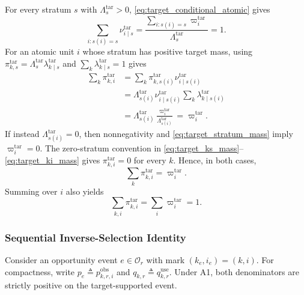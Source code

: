 For every stratum $s$ with $\Lambda_s^{\mathrm{tar}}>0$,
\eqref{eq:target_conditional_atomic} gives
\begin{equation}
    \sum_{i:s(i)=s}
    \nu^{\mathrm{tar}}_{i\mid s}
    =
    \frac{
    \sum_{i:s(i)=s}\varpi_i^{\mathrm{tar}}
    }{
    \Lambda_s^{\mathrm{tar}}
    }
    =1.
    \label{eq:app_nu_normalization}
\end{equation}
For an atomic unit $i$ whose stratum has positive target mass, using
$\pi^{\mathrm{tar}}_{k,s}
=\Lambda_s^{\mathrm{tar}}
\lambda^{\mathrm{tar}}_{k\mid s}$ and
$\sum_k\lambda^{\mathrm{tar}}_{k\mid s}=1$ gives
\begin{align}
 \sum_k\pi^{\mathrm{tar}}_{k,i}
 &=
 \sum_k
 \pi^{\mathrm{tar}}_{k,s(i)}
 \nu^{\mathrm{tar}}_{i\mid s(i)}
 \nonumber\\
 &=
 \Lambda_{s(i)}^{\mathrm{tar}}
 \nu^{\mathrm{tar}}_{i\mid s(i)}
 \sum_k
 \lambda^{\mathrm{tar}}_{k\mid s(i)}
 \nonumber\\
 &=
 \Lambda_{s(i)}^{\mathrm{tar}}
 \frac{\varpi_i^{\mathrm{tar}}}
 {\Lambda_{s(i)}^{\mathrm{tar}}}
 =
 \varpi_i^{\mathrm{tar}}.
 \label{eq:app_target_compatibility_positive}
\end{align}
If instead $\Lambda_{s(i)}^{\mathrm{tar}}=0$, then nonnegativity and
\eqref{eq:target_stratum_mass} imply $\varpi_i^{\mathrm{tar}}=0$.  The
zero-stratum convention in
\eqref{eq:target_ks_mass}--\eqref{eq:target_ki_mass}
gives $\pi^{\mathrm{tar}}_{k,i}=0$ for every $k$.  Hence, in both cases,
\begin{equation}
 \sum_k\pi^{\mathrm{tar}}_{k,i}
 =\varpi_i^{\mathrm{tar}}.
 \label{eq:app_target_compatibility}
\end{equation}
Summing over $i$ also yields
\begin{equation}
    \sum_{k,i}\pi^{\mathrm{tar}}_{k,i}
    =
    \sum_i\varpi_i^{\mathrm{tar}}
    =1.
    \label{eq:app_pi_normalized}
\end{equation}

\subsubsection{Sequential Inverse-Selection Identity}

Consider an opportunity event $e\in\mathcal{O}_r$ with mark
$(k_e,i_e)=(k,i)$.  For compactness, write
$p_e\triangleq p^{\mathrm{obs}}_{k,r,i}$ and
$q_{k,r}\triangleq q^{\mathrm{use}}_{k,r}$.
Under A1, both denominators are strictly positive on the target-supported event.

